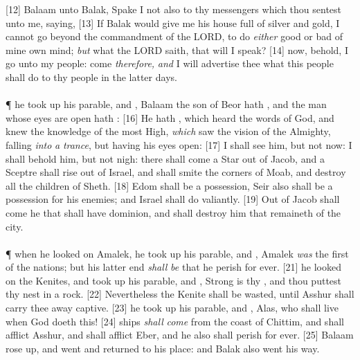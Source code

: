 [12] \textcolor[cmyk]{0.99998,1,0,0}{ Balaam  unto Balak, Spake I not also to thy messengers which thou sentest unto me, saying,}
[13] \textcolor[cmyk]{0.99998,1,0,0}{If Balak would give me his house full of silver and gold, I cannot go beyond the commandment of the LORD, to do \emph{either} good or bad of mine own mind; \emph{but} what the LORD saith, that will I speak?}
[14] \textcolor[cmyk]{0.99998,1,0,0}{ now, behold, I go unto my people: come \emph{therefore,} \emph{and} I will advertise thee what this people shall do to thy people in the latter days.}\\
\\
\P \textcolor[cmyk]{0.99998,1,0,0}{ he took up his parable, and , Balaam the son of Beor hath , and the man whose eyes are open hath :}
[16] \textcolor[cmyk]{0.99998,1,0,0}{He hath , which heard the words of God, and knew the knowledge of the most High, \emph{which} saw the vision of the Almighty, falling \emph{into} \emph{a} \emph{trance}, but having his eyes open:}
[17] \textcolor[cmyk]{0.99998,1,0,0}{I shall see him, but not now: I shall behold him, but not nigh: there shall come a Star out of Jacob, and a Sceptre shall rise out of Israel, and shall smite the corners of Moab, and destroy all the children of Sheth.}
[18] \textcolor[cmyk]{0.99998,1,0,0}{ Edom shall be a possession, Seir also shall be a possession for his enemies; and Israel shall do valiantly.}
[19] \textcolor[cmyk]{0.99998,1,0,0}{Out of Jacob shall come he that shall have dominion, and shall destroy him that remaineth of the city.}\\
\\
\P \textcolor[cmyk]{0.99998,1,0,0}{ when he looked on Amalek, he took up his parable, and , Amalek \emph{was} the first of the nations; but his latter end \emph{shall} \emph{be} that he perish for ever.}
[21] \textcolor[cmyk]{0.99998,1,0,0}{ he looked on the Kenites, and took up his parable, and , Strong is thy , and thou puttest thy nest in a rock.}
[22] \textcolor[cmyk]{0.99998,1,0,0}{Nevertheless the Kenite shall be wasted, until Asshur shall carry thee away captive.}
[23] \textcolor[cmyk]{0.99998,1,0,0}{ he took up his parable, and , Alas, who shall live when God doeth this!}
[24] \textcolor[cmyk]{0.99998,1,0,0}{ ships \emph{shall} \emph{come} from the coast of Chittim, and shall afflict Asshur, and shall afflict Eber, and he also shall perish for ever.}
[25] \textcolor[cmyk]{0.99998,1,0,0}{ Balaam rose up, and went and returned to his place: and Balak also went his way.}